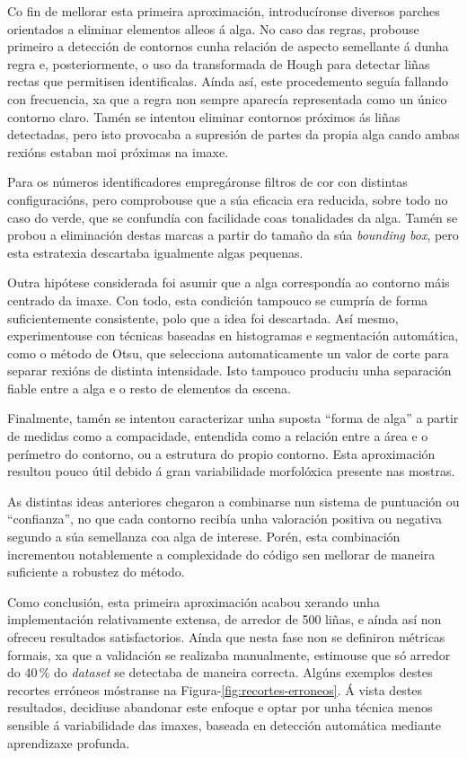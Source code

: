 Co fin de mellorar esta primeira aproximación, introducíronse diversos parches orientados a eliminar
elementos alleos á alga. No caso das regras, probouse primeiro a detección de contornos cunha
relación de aspecto semellante á dunha regra e, posteriormente, o uso da transformada de Hough para
detectar liñas rectas que permitisen identificalas. Aínda así, este procedemento seguía fallando con
frecuencia, xa que a regra non sempre aparecía representada como un único contorno claro. Tamén se
intentou eliminar contornos próximos ás liñas detectadas, pero isto provocaba a supresión de partes
da propia alga cando ambas rexións estaban moi próximas na imaxe.

Para os números identificadores empregáronse filtros de cor con distintas configuracións, pero comprobouse
que a súa eficacia era reducida, sobre todo no caso do verde, que se confundía con
facilidade coas tonalidades da alga. Tamén se probou a eliminación destas marcas a partir do tamaño
da súa \textit{bounding box}, pero esta estratexia descartaba igualmente algas pequenas.

Outra hipótese considerada foi asumir que a alga correspondía ao contorno máis centrado da imaxe. Con
todo, esta condición tampouco se cumpría de forma suficientemente consistente, polo que a idea foi
descartada. Así mesmo, experimentouse con técnicas baseadas en histogramas e segmentación automática,
como o método de Otsu, que selecciona automaticamente un valor de corte para separar rexións de
distinta intensidade. Isto tampouco produciu unha separación fiable entre a alga e o resto de
elementos da escena.

Finalmente, tamén se intentou caracterizar unha suposta ``forma de alga'' a partir de medidas como a
compacidade, entendida como a relación entre a área e o perímetro do contorno, ou a estrutura do propio contorno.
Esta aproximación resultou pouco útil debido á gran
variabilidade morfolóxica presente nas mostras.

As distintas ideas anteriores chegaron a combinarse nun sistema de puntuación ou ``confianza'', no
que cada contorno recibía unha valoración positiva ou negativa segundo a súa semellanza coa alga de
interese. Porén, esta combinación incrementou notablemente a complexidade do código sen mellorar de
maneira suficiente a robustez do método.

Como conclusión, esta primeira aproximación acabou xerando unha implementación relativamente extensa,
de arredor de 500 liñas, e aínda así non ofreceu resultados satisfactorios. Aínda que nesta fase non
se definiron métricas formais, xa que a validación se realizaba manualmente, estimouse que só arredor
do 40\,\% do \textit{dataset} se detectaba de maneira correcta. Algúns exemplos destes recortes
erróneos móstranse na Figura-\ref{fig:recortes-erroneos}. Á vista destes resultados, decidiuse
abandonar este enfoque e optar por unha técnica menos sensible á variabilidade das imaxes, baseada en
detección automática mediante aprendizaxe profunda.

